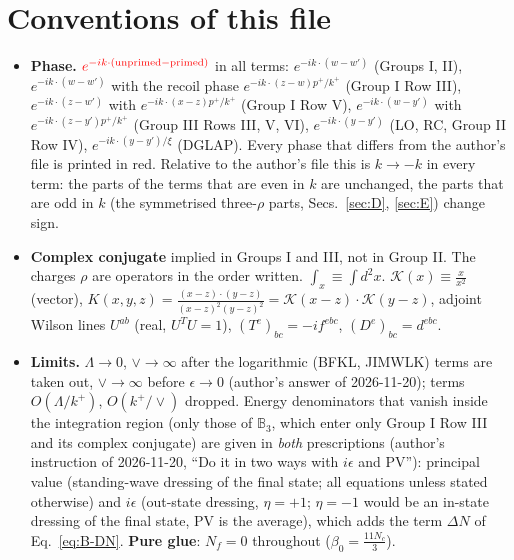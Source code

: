\documentclass[9pt]{article}
\numberwithin{equation}{section}
\begin{document}
\section{Conventions of this file}\label{sec:conv}
\begin{itemize}
\item \textbf{Phase.} ${\color{red}e^{-ik\cdot(\text{unprimed}-\text{primed})}}$ in all terms: $e^{-ik\cdot(w-w')}$ (Groups I, II), $e^{-ik\cdot(w-w')}$ with the recoil phase $e^{-ik\cdot(z-w)p^{+}/k^{+}}$ (Group I Row III), $e^{-ik\cdot(z-w')}$ with $e^{-ik\cdot(x-z)p^{+}/k^{+}}$ (Group I Row V), $e^{-ik\cdot(w-y')}$ with $e^{-ik\cdot(z-y')p^{+}/k^{+}}$ (Group III Rows III, V, VI), $e^{-ik\cdot(y-y')}$ (LO, RC, Group II Row IV), $e^{-ik\cdot(y-y')/\xi}$ (DGLAP). Every phase that differs from the author's file is printed in red. Relative to the author's file this is $k\to-k$ in every term: the parts of the terms that are even in $k$ are unchanged, the parts that are odd in $k$ (the symmetrised three-$\rho$ parts, Secs.~\ref{sec:D}, \ref{sec:E}) change sign.
\item \textbf{Complex conjugate} implied in Groups I and III, not in Group II. The charges $\rho$ are operators in the order written. $\int_{x}\equiv\int d^{2}x$. $\mathcal{K}(x)\equiv\frac{x}{x^{2}}$ (vector), $K(x,y,z)=\frac{(x-z)\cdot(y-z)}{(x-z)^{2}(y-z)^{2}}=\mathcal{K}(x-z)\cdot\mathcal{K}(y-z)$, adjoint Wilson lines $U^{ab}$ (real, $U^{T}U=1$), $(T^{e})_{bc}=-if^{ebc}$, $(D^{e})_{bc}=d^{ebc}$.
\item \textbf{Limits.} $\Lambda\to0$, $\vee\to\infty$ after the logarithmic (BFKL, JIMWLK) terms are taken out, $\vee\to\infty$ before $\epsilon\to0$ (author's answer of 2026-11-20); terms $O(\Lambda/k^{+})$, $O(k^{+}/\vee)$ dropped. Energy denominators that vanish inside the integration region (only those of $\mathbb{B}_{3}$, which enter only Group I Row III and its complex conjugate) are given in \emph{both} prescriptions (author's instruction of 2026-11-20, ``Do it in two ways with $i\epsilon$ and PV''): principal value (standing-wave dressing of the final state; all equations unless stated otherwise) and $i\epsilon$ (out-state dressing, $\eta=+1$; $\eta=-1$ would be an in-state dressing of the final state, PV is the average), which adds the term $\Delta N$ of Eq.~\eqref{eq:B-DN}. \textbf{Pure glue}: $N_{f}=0$ throughout ($\beta_{0}=\frac{11N_{c}}{3}$).

\end{itemize}
\end{document}
